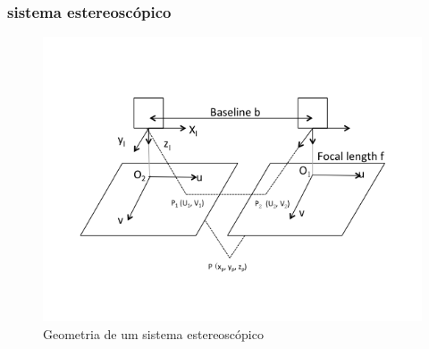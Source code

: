 \begin{frame}
  \frametitle{sistema estereoscópico}
\begin{figure}[h!]
  \begin{center}
    \includegraphics[width=\textwidth]{images/Stereoscopic_schematic.png}
  \end{center}
  \caption{Geometria de um sistema estereoscópico}
  \label{fig:7-40}
\end{figure}

\end{frame}
